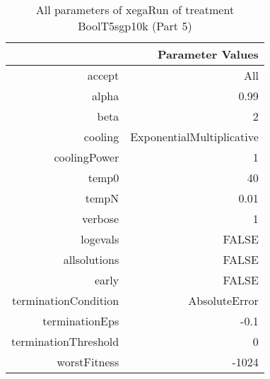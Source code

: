 \begin{table}[ht]
\centering
\begin{tabular}{rr}
  \hline
 & Parameter Values \\ 
  \hline
accept & All \\ 
  alpha & 0.99 \\ 
  beta & 2 \\ 
  cooling & ExponentialMultiplicative \\ 
  coolingPower & 1 \\ 
  temp0 & 40 \\ 
  tempN & 0.01 \\ 
  verbose & 1 \\ 
  logevals & FALSE \\ 
  allsolutions & FALSE \\ 
  early & FALSE \\ 
  terminationCondition & AbsoluteError \\ 
  terminationEps & -0.1 \\ 
  terminationThreshold & 0 \\ 
  worstFitness & -1024 \\ 
   \hline
\end{tabular}
\caption{ All parameters of xegaRun of treatment BoolT5sgp10k 
 (Part 5)} 
\end{table}

